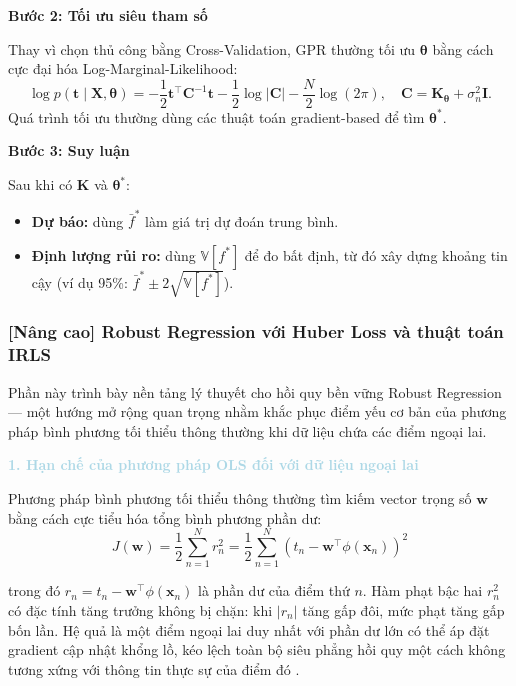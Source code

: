 \textbf{Bước 2: Tối ưu siêu tham số}

Thay vì chọn thủ công bằng Cross-Validation, GPR thường tối ưu $\boldsymbol{\theta}$ bằng cách cực đại hóa Log-Marginal-Likelihood:
\begin{equation}
    \log p(\mathbf{t}\mid\mathbf{X},\boldsymbol{\theta})
    = -\frac{1}{2}\mathbf{t}^\top\mathbf{C}^{-1}\mathbf{t}
      -\frac{1}{2}\log|\mathbf{C}|
      -\frac{N}{2}\log(2\pi),
    \quad \mathbf{C}=\mathbf{K}_{\boldsymbol{\theta}}+\sigma_n^2\mathbf{I}.
\end{equation}
Quá trình tối ưu thường dùng các thuật toán gradient-based để tìm $\boldsymbol{\theta}^*$.

\textbf{Bước 3: Suy luận}

Sau khi có $\mathbf{K}$ và $\boldsymbol{\theta}^*$:
\begin{itemize} [labelsep=10pt, leftmargin=2cm]
    \item \textbf{Dự báo:} dùng $\bar f^*$ làm giá trị dự đoán trung bình.
    \item \textbf{Định lượng rủi ro:} dùng $\mathbb{V}[f^*]$ để đo bất định, từ đó xây dựng khoảng tin cậy (ví dụ 95\%: $\bar f^* \pm 2\sqrt{\mathbb{V}[f^*]}$).
\end{itemize}

\subsubsection{[Nâng cao] Robust Regression với Huber Loss và thuật toán IRLS}

Phần này trình bày nền tảng lý thuyết cho hồi quy bền vững Robust Regression --- 
một hướng mở rộng quan trọng nhằm khắc phục điểm yếu cơ bản của phương pháp bình 
phương tối thiểu thông thường khi dữ liệu chứa các điểm ngoại lai.

\noindent\textcolor{lightblue}{\textbf{1. Hạn chế của phương pháp OLS đối với dữ liệu ngoại lai}}

Phương pháp bình phương tối thiểu thông thường
tìm kiếm vector trọng số $\boldsymbol{w}$ bằng cách cực tiểu hóa tổng bình phương 
phần dư:
$$J(\boldsymbol{w}) = \frac{1}{2}\sum_{n=1}^{N} r_n^2 
  = \frac{1}{2}\sum_{n=1}^{N} \left(t_n - \boldsymbol{w}^{\top}\phi(\boldsymbol{x}_n)\right)^2$$

trong đó $r_n = t_n - \boldsymbol{w}^{\top}\phi(\boldsymbol{x}_n)$ là phần dư 
của điểm thứ $n$. Hàm phạt bậc hai $r_n^2$ có đặc tính tăng trưởng không bị 
chặn: khi $|r_n|$ tăng gấp đôi, mức phạt tăng gấp bốn lần. Hệ quả là một điểm 
ngoại lai duy nhất với phần dư lớn có thể áp đặt gradient cập nhật khổng lồ, 
kéo lệch toàn bộ siêu phẳng hồi quy một cách không tương xứng với thông tin 
thực sự của điểm đó \cite{bishop2006pattern}.

